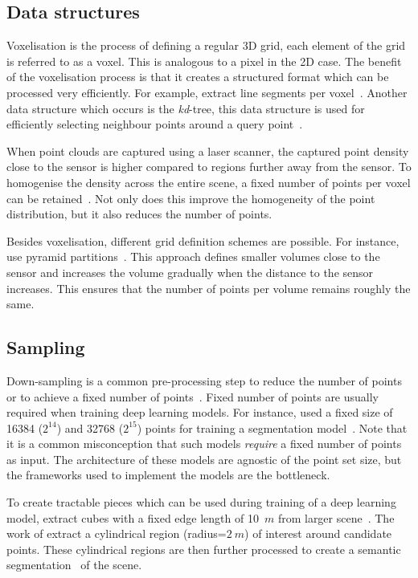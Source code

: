 \subsection{Data structures}
Voxelisation is the process of defining a regular 3D grid, each element of the grid is referred to as a voxel. This is analogous to a pixel in the 2D case. The benefit of the voxelisation process is that it creates a structured format which can be processed very efficiently. For example, \citeauthor{jung2016multi-range} extract line segments per voxel~\cite{jung2016multi-range}. Another data structure which occurs is the \textit{kd}-tree, this data structure is used for efficiently selecting neighbour points around a query point~\cite{arastounia2015automated}.

When point clouds are captured using a laser scanner, the captured point density close to the sensor is higher compared to regions further away from the sensor. To homogenise the density across the entire scene, a fixed number of points per voxel can be retained~\cite{lamas2021automatic,grandio2022point}. Not only does this improve the homogeneity of the point distribution, but it also reduces the number of points.


Besides voxelisation, different grid definition schemes are possible. For instance, \citeauthor{yu2022real-time} use pyramid partitions~\cite{yu2022real-time}. This approach defines smaller volumes close to the sensor and increases the volume gradually when the distance to the sensor increases. This ensures that the number of points per volume remains roughly the same.

\subsection{Sampling}
Down-sampling is a common pre-processing step to reduce the number of points or to achieve a fixed number of points~\cite{cui2020real-time, grandio2022point}. Fixed number of points are usually required when training deep learning models. For instance, \citeauthor{grandio2022point} used a fixed size of 16384 (\(2^{14}\)) and 32768 (\(2^{15}\)) points for training a \pnpp{} segmentation model~\cite{grandio2022point}. Note that it is a common misconception that such models \textit{require} a fixed number of points as input. The architecture of these models are agnostic of the point set size, but the frameworks used to implement the models are the bottleneck.

To create tractable pieces which can be used during training of a deep learning model, \citeauthor{grandio2022point} extract cubes with a fixed edge length of 10~$m$ from larger scene~\cite{grandio2022point}. The work of \citeauthor{corongiu2020classification} extract a cylindrical region (radius=$2~m$) of interest around candidate points. These cylindrical regions are then further processed to create a semantic segmentation~\cite{corongiu2020classification} of the scene.

